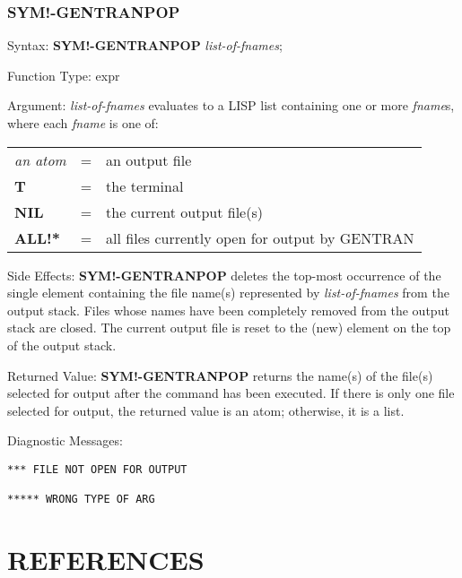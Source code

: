 \subsection{SYM!-GENTRANPOP}
\begin{describe}{Syntax:}
{\bf SYM!-GENTRANPOP} {\it list-of-fnames\/};
\end{describe} 
\begin{describe}{Function Type:}
expr
\end{describe} 
\begin{describe}{Argument:}
{\it list-of-fnames\/} evaluates to a LISP list containing one or more
{\it fname\/}s, where each {\it fname\/} is one of:

\begin{tabular}{lll}
{\it an atom} & = &  an output file\\
{\bf T} & = & the terminal\\
{\bf NIL} & = & the current output file(s)\\
{\bf ALL!*} & = & all files currently open for output by GENTRAN\\
\end{tabular}
\end{describe} 
\begin{describe}{Side Effects:}
{\bf SYM!-GENTRANPOP} deletes the top-most occurrence of the
single element containing the file name(s) represented by {\it list-of-fnames\/}
from the output stack.  Files whose names have been
completely removed from the output stack are closed.  The current output file
is reset to the (new) element on the top of the output stack.
\end{describe} 
\begin{describe}{Returned Value:}
{\bf SYM!-GENTRANPOP} returns the name(s) of the file(s)
selected for output after the command has been executed.  If there is
only one file selected for output, the returned value is an atom; otherwise,
it is a list.
\end{describe} 
\begin{describe}{Diagnostic Messages:}
\begin{verbatim}
*** FILE NOT OPEN FOR OUTPUT

***** WRONG TYPE OF ARG

\end{verbatim}
\end{describe}

\chapter{REFERENCES}

